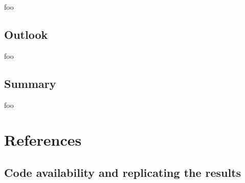\documentclass[letter,12pt,notitlepage]{article}
\begin{document}
foo

\subsection{Outlook}

foo

\subsection{Summary}

foo

\vfill
\clearpage %

\section{References}
\printbibliography[heading=none]

\vfill
\clearpage %

\begin{appendices}

\section{Code availability and replicating the results}
\label{appendix:coderesultsrepro}

\end{appendices}
\end{document}
